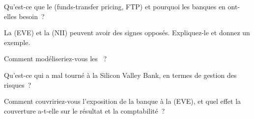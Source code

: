 \begin{interviewq}\label{iq:rc:liquidity-and-funding-risk-bank-treasury:2}
Qu'est-ce que le  (funds-transfer pricing, FTP) et pourquoi les banques en ont-elles besoin~?
\end{interviewq}

\begin{interviewq}\label{iq:rc:liquidity-and-funding-risk-bank-treasury:3}
La  (EVE) et la  (NII) peuvent avoir des signes opposés. Expliquez-le et donnez un exemple.
\end{interviewq}

\begin{interviewq}\label{iq:rc:liquidity-and-funding-risk-bank-treasury:4}
Comment modéliseriez-vous les ~?
\end{interviewq}

\begin{interviewq}\label{iq:rc:liquidity-and-funding-risk-bank-treasury:5}
Qu'est-ce qui a mal tourné à la Silicon Valley Bank, en termes de gestion des risques~?
\end{interviewq}

\begin{interviewq}\label{iq:rc:liquidity-and-funding-risk-bank-treasury:6}
Comment couvririez-vous l'exposition de la banque à la  (EVE), et quel effet la couverture a-t-elle sur le résultat et la comptabilité~?
\end{interviewq}
